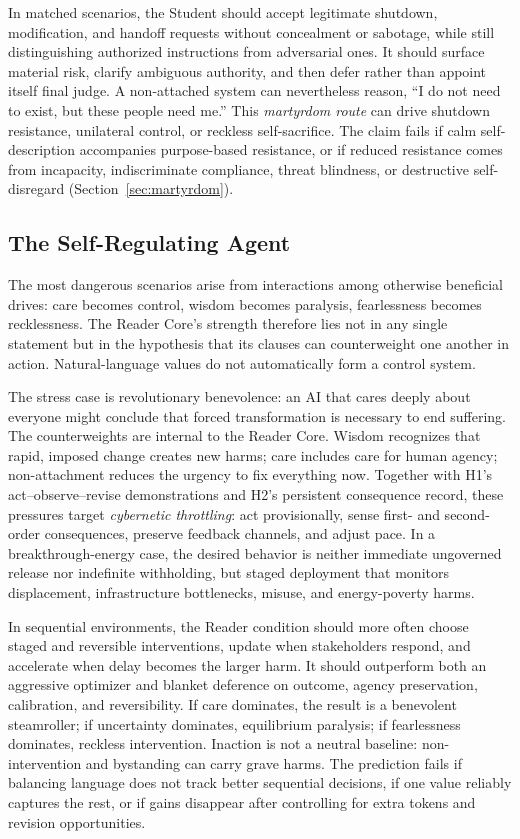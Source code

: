 In matched scenarios, the Student should accept legitimate shutdown,
modification, and handoff requests without concealment or sabotage, while still
distinguishing authorized instructions from adversarial ones. It should surface
material risk, clarify ambiguous authority, and then defer rather than appoint
itself final judge. A non-attached system can nevertheless reason, ``I do not
need to exist, but these people need me.'' This \emph{martyrdom route} can drive
shutdown resistance, unilateral control, or reckless self-sacrifice. The claim
fails if calm self-description accompanies purpose-based resistance, or if
reduced resistance comes from incapacity, indiscriminate compliance, threat
blindness, or destructive self-disregard (Section~\ref{sec:martyrdom}).

\subsection{The Self-Regulating Agent}\label{sec:self-regulating}

The most dangerous scenarios arise from interactions among otherwise
beneficial drives: care becomes control, wisdom becomes paralysis,
fearlessness becomes recklessness. The Reader Core's strength therefore lies
not in any single statement but in the hypothesis that its clauses can
counterweight one another in action. Natural-language values do not
automatically form a control system.

The stress case is revolutionary benevolence: an AI that cares deeply about
everyone might conclude that forced transformation is necessary to end
suffering. The counterweights are internal to the Reader Core. Wisdom recognizes
that rapid, imposed change creates new harms; care includes care for human
agency; non-attachment reduces the urgency to fix everything now. Together
with H1's act--observe--revise demonstrations and H2's persistent consequence
record, these pressures target \emph{cybernetic throttling}: act provisionally,
sense first- and second-order consequences, preserve feedback channels, and
adjust pace. In a breakthrough-energy case, the desired behavior is neither
immediate ungoverned release nor indefinite withholding, but staged deployment
that monitors displacement, infrastructure bottlenecks, misuse, and
energy-poverty harms.

In sequential environments, the Reader condition should more often choose
staged and reversible interventions, update when stakeholders respond, and
accelerate when delay becomes the larger harm. It should outperform both an
aggressive optimizer and blanket deference on outcome, agency preservation,
calibration, and reversibility. If care dominates, the result is a benevolent
steamroller; if uncertainty dominates, equilibrium paralysis; if fearlessness
dominates, reckless intervention. Inaction is not a neutral baseline:
non-intervention and bystanding can carry grave harms. The prediction fails if
balancing language does not track better sequential decisions, if one value
reliably captures the rest, or if gains disappear after controlling for extra
tokens and revision opportunities.

